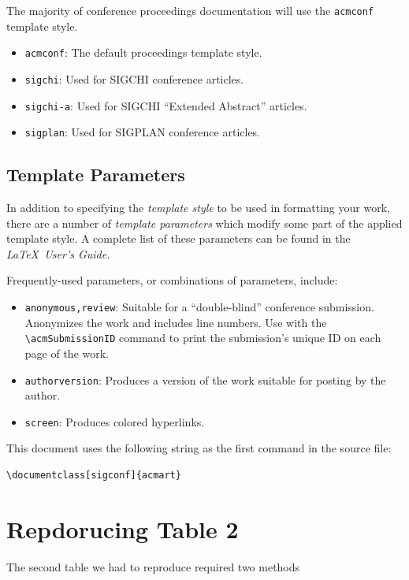 \documentclass[sigconf]{acmart}
\begin{document}
The majority of conference proceedings documentation will use the {\verb|acmconf|} template style.
\begin{itemize}
\item {\verb|acmconf|}: The default proceedings template style.
\item{\verb|sigchi|}: Used for SIGCHI conference articles.
\item{\verb|sigchi-a|}: Used for SIGCHI ``Extended Abstract'' articles.
\item{\verb|sigplan|}: Used for SIGPLAN conference articles.
\end{itemize}

\subsection{Template Parameters}

In addition to specifying the {\itshape template style} to be used in
formatting your work, there are a number of {\itshape template parameters}
which modify some part of the applied template style. A complete list
of these parameters can be found in the {\itshape \LaTeX\ User's Guide.}

Frequently-used parameters, or combinations of parameters, include:
\begin{itemize}
\item {\verb|anonymous,review|}: Suitable for a ``double-blind''
  conference submission. Anonymizes the work and includes line
  numbers. Use with the \verb|\acmSubmissionID| command to print the
  submission's unique ID on each page of the work.
\item{\verb|authorversion|}: Produces a version of the work suitable
  for posting by the author.
\item{\verb|screen|}: Produces colored hyperlinks.
\end{itemize}

This document uses the following string as the first command in the
source file:
\begin{verbatim}
\documentclass[sigconf]{acmart}
\end{verbatim}

\section{Repdorucing Table 2}
The second table we had to reproduce required two methods
\end{document}
